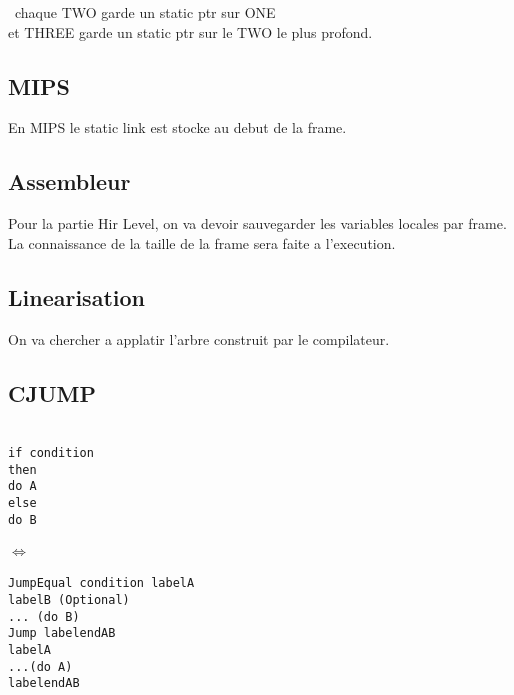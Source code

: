 \documentclass[a4paper,11pt]{article}
\begin{document}
\
chaque TWO garde un static ptr sur ONE\\et THREE garde un static ptr sur le TWO le plus profond.

\subsection{MIPS}
En MIPS le static link est stocke au debut de la frame.
\subsection{Assembleur}
Pour la partie Hir Level, on va devoir sauvegarder les variables locales par frame. \\
La connaissance de la taille de la frame sera faite a l'execution.\\


\subsection{Linearisation}

On va chercher a applatir l'arbre construit par le compilateur.\\

\newpage
\subsection{CJUMP}
\textemdash \textemdash \textemdash\textemdash \textemdash \textemdash \\
\texttt{if condition\\ then\\ do A\\ else\\ do B}\\
\textemdash \textemdash \textemdash\textemdash \textemdash \textemdash \\
$\Longleftrightarrow $\\
\textemdash \textemdash \textemdash\textemdash \textemdash \textemdash \\
\texttt{JumpEqual condition labelA\\
labelB (Optional)\\
... (do B)\\
Jump labelendAB\\
labelA\\
...(do A)\\
labelendAB\\
}
\textemdash \textemdash \textemdash \textemdash \textemdash \textemdash \\
\end{document}
